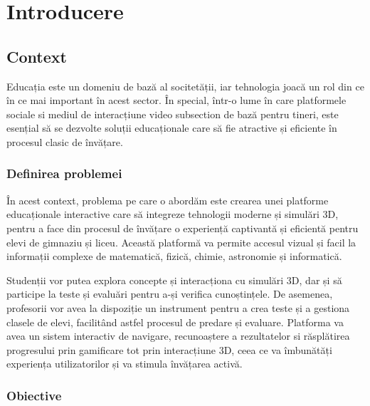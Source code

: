 \chapter{Introducere}
\label{chapter:intro}


\section{Context}
\label{sec:proj}
Educația este un domeniu de bază al socitetății, iar tehnologia joacă un rol din ce în ce mai important 
în acest sector. În special, într-o lume în care platformele sociale si mediul de interacțiune video subsection
de bază pentru tineri, este esențial să se dezvolte soluții educaționale care să fie atractive și eficiente în 
procesul clasic de învățare.

\subsection{Definirea problemei}
\label{sub-sec:proj-scope}
În acest context, problema pe care o abordăm este crearea unei platforme educaționale interactive care să integreze
tehnologii moderne și simulări 3D, pentru a face din procesul de învățare o experiență captivantă și eficientă pentru
elevi de gimnaziu și liceu. Această platformă va permite accesul vizual și facil la informații complexe de matematică,
fizică, chimie, astronomie și informatică.

Studenții vor putea explora concepte și interacționa cu simulări 3D, dar și să participe la teste și evaluări
pentru a-și verifica cunoștințele. De asemenea, profesorii vor avea la dispoziție un instrument pentru a crea teste și
a gestiona clasele de elevi, facilitând astfel procesul de predare și evaluare. Platforma va avea un sistem interactiv de 
navigare, recunoaștere a rezultatelor si răsplătirea progresului prin gamificare tot prin interacțiune 3D, ceea ce va
îmbunătăți experiența utilizatorilor și va stimula învățarea activă.


\subsection{Obiective}
\label{sub-sec:proj-objectives}

